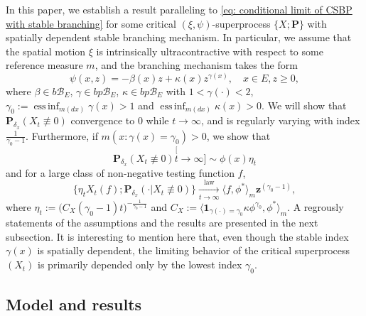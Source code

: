 \documentclass[12pt, a4paper]{amsart}
\theoremstyle{definition}
\numberwithin{equation}{section}
\begin{document}
	In this paper, we establish a result paralleling to \eqref{eq: conditional limit of CSBP with stable branching} for some critical $(\xi,\psi)$-superprocess $\{X; \mathbf P\}$ with spatially dependent stable branching mechanism.
	In particular, we assume that the spatial motion $\xi$ is intrinsically ultracontractive with respect to some reference measure $m$, and the branching mechanism takes the form
\[
	\psi(x,z) = -\beta (x) z + \kappa(x) z^{\gamma(x)},
	\quad x\in E, z \geq 0,
\]
	where $\beta \in b\mathscr B_E$, $\gamma \in bp\mathscr B_E$, $\kappa \in bp\mathscr B_E$ with $1< \gamma(\cdot )<2$, $\gamma_0 := \operatorname{ess\,inf}_{m(dx)} \gamma(x)> 1$ and $\operatorname{ess\,inf}_{m(dx)}\kappa(x) > 0$.
	We will show that $\mathbf P_{\delta_x}( X_t \not \equiv 0) $ convergence to $0$ while $t\to \infty$, and is regularly varying with index $\frac{1}{\gamma_0 - 1}$.
	Furthermore, if $m(x: \gamma(x) = \gamma_0)>0$, we show that
\[
	\mathbf P_{\delta_x}( X_t \not \equiv 0)
	\stackrel[t\to \infty]{}{\sim} \phi(x) \eta_t
\]
	and for a large class of non-negative testing function $f$,
\[
	\{   \eta_t X_t(f) ; \mathbf P_{\delta_x}(\cdot | X_t \not \equiv 0) \}
	\xrightarrow[t\to \infty]{\operatorname{law}}
	\langle f, \phi^*\rangle_m \mathbf z^{(\gamma_0 - 1)},
\]
	where $\eta_t := \big( C_X(\gamma_0 - 1) t \big)^{- \frac {1} {\gamma_0 - 1} }$ and $C_X := \langle \mathbf 1_{\gamma(\cdot) = \gamma_0} \kappa \phi^{\gamma_0}, \phi^* \rangle_m$.
	A regrously statements of the assumptions and the results are presented in the next subsection.
	It
	is interesting to mention here that, even though the stable index $\gamma(x)$ is spatially dependent, the limiting behavior of the critical superprocess $(X_t)$ is primarily depended only by the lowest index $\gamma_0$.
	
\subsection{Model and results}
\end{document}
